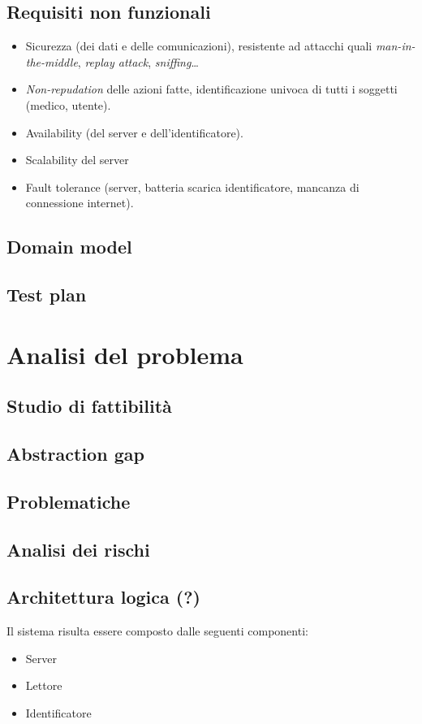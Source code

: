 \documentclass[a4paper,12pt]{report}
\begin{document}
\section{Requisiti non funzionali}
\begin{itemize}
	\item Sicurezza (dei dati e delle comunicazioni), resistente ad attacchi quali \emph{man-in-the-middle}, \emph{replay attack}, \emph{sniffing}\dots 
	\item \emph{Non-repudation} delle azioni fatte, identificazione univoca di tutti i soggetti (medico, utente). 
	\item Availability (del server e dell'identificatore).
	\item Scalability del server
	\item Fault tolerance (server, batteria scarica identificatore, mancanza di connessione internet).
\end{itemize}

\section{Domain model}

\section{Test plan}

\chapter{Analisi del problema}

\section{Studio di fattibilità}

\section{Abstraction gap}

\section{Problematiche}

\section{Analisi dei rischi}

\section{Architettura logica (?)}
Il sistema risulta essere composto dalle seguenti componenti:
\begin{itemize}
	\item Server
	\item Lettore
	\item Identificatore
\end{itemize}
\end{document}
